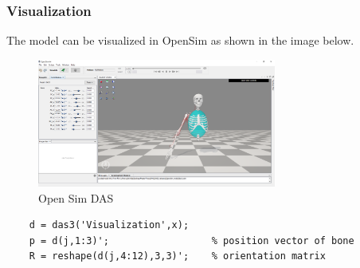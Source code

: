 \subsubsection{Visualization}

The model can be visualized in OpenSim as shown in the image below. 
\begin{figure}[h]
    \centering
    \includegraphics[width=0.7\textwidth]{Pictures/OpenSimModel.png}
    \caption{Open Sim DAS}
    \label{fig:OpenSimDAS}
\end{figure}

\begin{lstlisting}
    d = das3('Visualization',x);   
    p = d(j,1:3)';					% position vector of bone
	R = reshape(d(j,4:12),3,3)';	% orientation matrix
 \end{lstlisting}